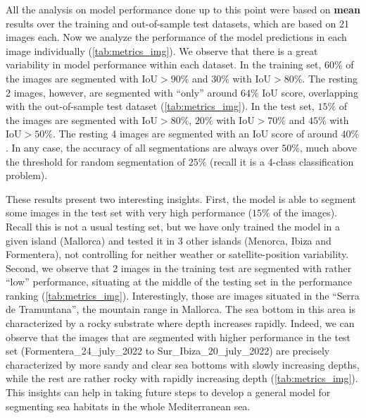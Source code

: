 All the analysis on model performance done up to this point were based on
\textbf{mean} results over the training and out-of-sample test datasets, which
are based on 21 images each. Now we analyze the performance of the model
predictions in each image individually (\cref{tab:metrics_img}). We observe
that there is a great variability in model performance within each dataset. In
the training set, $60\%$ of the images are segmented with IoU$>90\%$ and $30\%$
with IoU$>80\%$. The resting 2 images, however, are segmented with ``only''
around $64\%$ IoU score, overlapping with the out-of-sample test dataset
(\cref{tab:metrics_img}). In the test set, $15\%$ of the images are segmented
with IoU$>80\%$, $20\%$ with IoU$>70\%$ and $45\%$ with IoU$>50\%$. The resting
4 images are segmented with an IoU score of around $40\%$. In any case, the
accuracy of all segmentations are always over $50\%$, much above the threshold
for random segmentation of $25\%$ (recall it is a 4-class classification
problem).

These results present two interesting insights. First, the model is able to
segment some images in the test set with very high performance ($15\%$ of the
images). Recall this is not a usual testing set, but we have only trained the
model in a given island (Mallorca) and tested it in 3 other islands (Menorca,
Ibiza and Formentera), not controlling for neither weather or
satellite-position variability. Second, we observe that 2 images in the
training test are segmented with rather ``low'' performance, situating at the
middle of the testing set in the performance ranking
(\cref{tab:metrics_img}). Interestingly, those are images situated in the
``Serra de Tramuntana'', the mountain range in Mallorca. The sea bottom in this
area is characterized by a rocky substrate where depth increases rapidly.
Indeed, we can observe that the images that are segmented with higher
performance in the test set (Formentera\_24\_july\_2022 to
Sur\_Ibiza\_20\_july\_2022) are precisely characterized by more sandy and clear
sea bottoms with slowly increasing depths, while the rest are rather rocky with
rapidly increasing depth (\cref{tab:metrics_img}). This insights can help in
taking future steps to develop a general model for segmenting sea habitats in
the whole Mediterranean sea.

